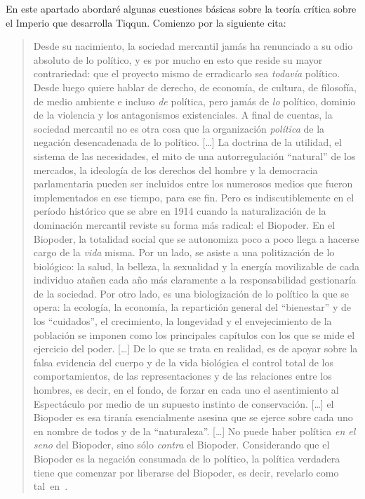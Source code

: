 En este apartado abordaré algunas cuestiones básicas sobre la teoría crítica sobre el Imperio que desarrolla Tiqqun. Comienzo por la siguiente cita:

\begin{quote}
  Desde su nacimiento, la sociedad mercantil jamás ha renunciado a su odio absoluto de lo político, y es por mucho en esto que reside su mayor contrariedad: que el proyecto mismo de erradicarlo sea \emph{todavía} político. Desde luego quiere hablar de derecho, de economía, de cultura, de filosofía, de medio ambiente e incluso \emph{de} política, pero jamás de \emph{lo} político, dominio de la violencia y los antagonismos existenciales. A final de cuentas, la sociedad mercantil no es otra cosa que la organización \emph{política} de la negación desencadenada de lo político. [\ldots] La doctrina de la utilidad, el sistema de las necesidades, el mito de una autorregulación \enquote{natural} de los mercados, la ideología de los derechos del hombre y la democracia parlamentaria pueden ser incluidos entre los numerosos medios que fueron implementados en ese tiempo, para ese fin. Pero es indiscutiblemente en el período histórico que se abre en 1914 cuando la naturalización de la dominación mercantil reviste su forma más radical: el Biopoder. En el Biopoder, la totalidad social que se autonomiza poco a poco llega a hacerse cargo de la \emph{vida} misma. Por un lado, se asiste a una politización de lo biológico: la salud, la belleza, la sexualidad y la energía movilizable de cada individuo atañen cada año más claramente a la responsabilidad gestionaría de la sociedad. Por otro lado, es una biologización de lo político la que se opera: la ecología, la economía, la repartición general del \enquote{bienestar} y de los \enquote{cuidados}, el crecimiento, la longevidad y el envejecimiento de la población se imponen como los principales capítulos con los que se mide el ejercicio del poder. [\ldots] De lo que se trata en realidad, es de apoyar sobre la falsa evidencia del cuerpo y de la vida biológica el control total de los comportamientos, de las representaciones y de las relaciones entre los hombres, es decir, en el fondo, de forzar en cada uno el asentimiento al Espectáculo por medio de un supuesto instinto de conservación. [\ldots] el Biopoder es esa tiranía esencialmente asesina que se ejerce sobre cada uno en nombre de todos y de la \enquote{naturaleza}. [\ldots] No puede haber política \emph{en el seno} del Biopoder, sino sólo \emph{contra} el Biopoder. Considerando que el Biopoder es la negación consumada de lo político, la política verdadera tiene que comenzar por liberarse del Biopoder, es decir, revelarlo como tal~en~\autocite[Tesis V]{tiqqunTesisSobrePartido}.
\end{quote}

